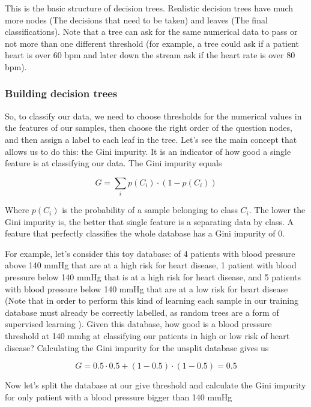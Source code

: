 \documentclass[a4paper]{report}
\begin{document}
This is the basic structure of decision trees.
Realistic decision trees have much more nodes (The decisions that need to be taken) and leaves (The final classifications).
Note that a tree can ask for the same numerical data to pass or not more than one different threshold (for example, a tree could ask if a patient heart is over 60 bpm and later down the stream ask if the heart rate is over 80 bpm).

\subsubsection{Building decision trees}

So, to classify our data, we need to choose thresholds for the numerical values in the features of our samples, then choose the right order of the question nodes, and then assign a label to each leaf in the tree.
Let's see the main concept that allows us to do this:
the Gini impurity.
It is an indicator of how good a single feature is at classifying our data.
The Gini impurity equals

\begin{equation}
    G = \sum_i p(C_i) \cdot (1 - p(C_i))
\end{equation}

Where $p(C_i)$ is the probability of a sample belonging to class $C_i$.
The lower the Gini impurity is, the better that single feature is a separating data by class.
A feature that perfectly classifies the whole database has a Gini impurity of 0.

For example, let's consider this toy database:
of 4 patients with blood pressure above 140 mmHg that are at a high risk for heart disease, 1 patient with blood pressure below 140 mmHg that is at a high risk for heart disease, and 5 patients with blood pressure below 140 mmHg that are at a low risk for heart disease (Note that in order to perform this kind of learning each sample in our training database must already be correctly labelled, as random trees are a form of supervised learning ).
Given this database, how good is a blood pressure threshold at 140 mmhg at classifying our patients in high or low risk of heart disease?
Calculating the Gini impurity for the unsplit database gives us

\begin{equation}
    G = 0.5 \cdot 0.5 + (1-0.5) \cdot (1-0.5) = 0.5
\end{equation}

Now let's split the database at our give threshold and calculate the Gini impurity for only patient with a blood pressure bigger than 140 mmHg
\end{document}
